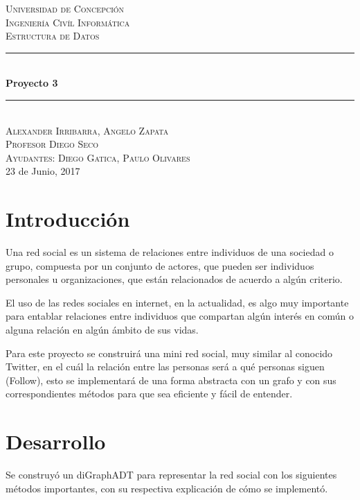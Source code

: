 \documentclass[12pt]{article}
\begin{document}
\begin{titlepage}

\newcommand{\HRule}{\rule{\linewidth}{0.5mm}}

\center

\textsc{\LARGE Universidad de Concepci\'on}\\[1.5cm] 
\textsc{\Large Ingenier\'ia Civ\'il Inform\'atica}\\[0.5cm]
\textsc{\large Estructura de Datos}\\[2.5cm]

\HRule \\[0.4cm]
{ \huge \bfseries Proyecto 3}\\[0.4cm]
\HRule \\[3.5cm]

\textsc{\large Alexander Irribarra, Angelo Zapata}\\[0.5cm]
\textsc{Profesor Diego Seco}\\
\textsc{Ayudantes: Diego Gatica, Paulo Olivares}\\[0.5cm]
{\large 23 de Junio, 2017}\\[3cm]

\vfill 
\end{titlepage}
\tableofcontents
\newpage
\section{Introducción}
\indent\indent  Una red social es un sistema de relaciones entre individuos de una sociedad o grupo, compuesta por un conjunto de actores, que pueden ser individuos personales u organizaciones, que están relacionados de acuerdo a algún criterio.

El uso de las redes sociales en internet, en la actualidad, es algo muy importante para entablar relaciones entre individuos que compartan algún interés en común o alguna relación en algún ámbito de sus vidas.

Para este proyecto se construirá una mini red social, muy similar al conocido Twitter, en el cuál la relación entre las personas será a qué personas siguen (Follow), esto se implementará de una forma abstracta con un grafo y con sus correspondientes métodos para que sea eficiente y fácil de entender.
\newpage
\section{Desarrollo}

\indent\indent Se construyó un diGraphADT para representar la red social con los siguientes métodos importantes, con su respectiva explicación de cómo se implementó.
\end{document}
